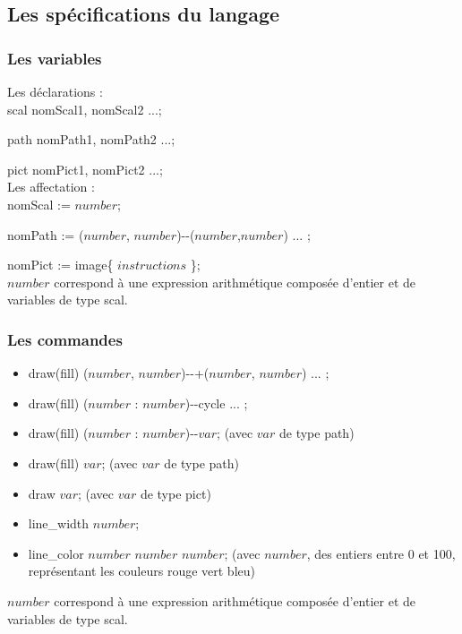 \documentclass[a4paper,titlepage]{article}
\begin{document}
\subsection{Les spécifications du langage}
\subsubsection{Les variables}
Les déclarations :\\

scal nomScal1, nomScal2 ...;

path nomPath1, nomPath2 ...;

pict nomPict1, nomPict2 ...;\\

Les affectation : \\

nomScal := $number$;

nomPath := ($number$, $number$)\--\--($number$,$number$) ... ;

nomPict := image\{ $instructions$ \};\\

$number$ correspond à une expression arithmétique composée d'entier et de variables de type scal.

\subsubsection{Les commandes}
\begin{itemize}
\item draw(fill) ($number$, $number$)\--\--+($number$, $number$) ... ;
\item draw(fill) ($number$ : $number$)\--\--cycle ... ;
\item draw(fill) ($number$ : $number$)\--\--$var$; \qquad (avec $var$ de type path)
\item draw(fill) $var$; \qquad (avec $var$ de type path)
\item draw $var$; \qquad (avec $var$ de type pict)
\item line\_width $number$;
\item line\_color $number$ $number$ $number$; \qquad (avec $number$, des entiers entre 0 et 100, représentant les couleurs rouge vert bleu) \\
\end{itemize}
$number$ correspond à une expression arithmétique composée d'entier et de variables de type scal.

\newpage
\end{document}
